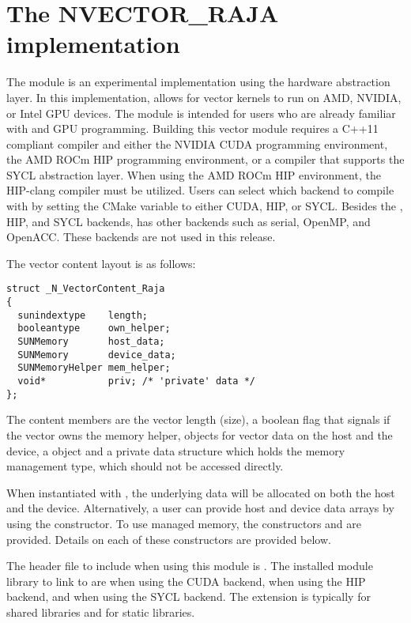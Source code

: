 \section{The NVECTOR\_RAJA implementation}\label{ss:nvec_raja}

The {\nvecraja} module is an experimental {\nvector} implementation using the
\href{https://software.llnl.gov/RAJA/}{\raja} hardware abstraction layer. In
this implementation, {\raja} allows for {\sundials} vector kernels to run on
AMD, NVIDIA, or Intel GPU devices. The module is intended for users who are
already familiar with {\raja} and GPU programming. Building this vector module
requires a C++11 compliant compiler and either the NVIDIA CUDA programming
environment, the AMD ROCm HIP programming environment, or a compiler that
supports the SYCL abstraction layer. When using the AMD ROCm HIP environment,
the HIP-clang compiler must be utilized. Users can select which backend to
compile with by setting the  CMake variable to
either CUDA, HIP, or SYCL. Besides the {\cuda}, HIP, and SYCL backends, {\raja}
has other backends such as serial, OpenMP, and OpenACC. These backends are not
used in this {\sundials} release.

The vector content layout is as follows:
\begin{verbatim}
struct _N_VectorContent_Raja
{
  sunindextype    length;
  booleantype     own_helper;
  SUNMemory       host_data;
  SUNMemory       device_data;
  SUNMemoryHelper mem_helper;
  void*           priv; /* 'private' data */
};
\end{verbatim}
The content members are the vector length (size), a boolean flag that signals if
the vector owns the memory helper,  objects for vector data on the
host and the device, a  object and a private data structure
which holds the memory management type, which should not be accessed directly.

When instantiated with , the underlying data will be allocated
on both the host and the device. Alternatively, a user can provide host
and device data arrays by using the  constructor. To use
managed memory, the constructors  and \newline
{} are provided. Details on each of these constructors
are provided below.


The header file to include when using this module is . The
installed module library to link to are
 when using the CUDA backend,
 when using the HIP backend, and
 when using the SYCL backend. The
extension  is typically  for shared libraries and
 for static libraries.

